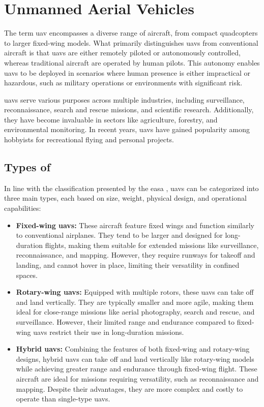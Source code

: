 \chapter{Unmanned Aerial Vehicles}
\label{ch:unmanned_aerial_vehicles}

The term \gls{uav} encompasses a diverse range of aircraft, from compact quadcopters to larger fixed-wing models. What primarily distinguishes \glspl{uav} from conventional aircraft is that \glspl{uav} are either remotely piloted or autonomously controlled, whereas traditional aircraft are operated by human pilots. This autonomy enables \glspl{uav} to be deployed in scenarios where human presence is either impractical or hazardous, such as military operations or environments with significant risk.

\glspl{uav} serve various purposes across multiple industries, including surveillance, reconnaissance, search and rescue missions, and scientific research. Additionally, they have become invaluable in sectors like agriculture, forestry, and environmental monitoring. In recent years, \glspl{uav} have gained popularity among hobbyists for recreational flying and personal projects.

\section{Types of }

In line with the classification presented by the \gls{easa} \autocite{eu-947-2019}, \glspl{uav} can be categorized into three main types, each based on size, weight, physical design, and operational capabilities:

\begin{itemize}
  \item \textbf{Fixed-wing \glspl{uav}:} These aircraft feature fixed wings and function similarly to conventional airplanes. They tend to be larger and designed for long-duration flights, making them suitable for extended missions like surveillance, reconnaissance, and mapping. However, they require runways for takeoff and landing, and cannot hover in place, limiting their versatility in confined spaces.

  \item \textbf{Rotary-wing \glspl{uav}:} Equipped with multiple rotors, these \glspl{uav} can take off and land vertically. They are typically smaller and more agile, making them ideal for close-range missions like aerial photography, search and rescue, and surveillance. However, their limited range and endurance compared to fixed-wing \glspl{uav} restrict their use in long-duration missions.

  \item \textbf{Hybrid \glspl{uav}:} Combining the features of both fixed-wing and rotary-wing designs, hybrid \glspl{uav} can take off and land vertically like rotary-wing models while achieving greater range and endurance through fixed-wing flight. These aircraft are ideal for missions requiring versatility, such as reconnaissance and mapping. Despite their advantages, they are more complex and costly to operate than single-type \glspl{uav}.
\end{itemize}

